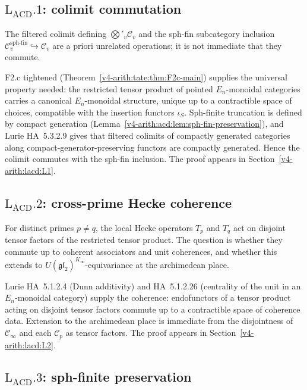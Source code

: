 \subsection{\(\mathrm{L}_{\mathrm{ACD}}.1\): colimit commutation}

The filtered colimit defining \(\bigotimes'_{v}\mathcal{C}_{v}\) and
the sph-fin subcategory inclusion
\(\mathcal{C}_{v}^{\mathrm{sph\text{-}fin}} \hookrightarrow \mathcal{C}_{v}\)
are a priori unrelated operations; it is not immediate that they commute.

F2.c tightened (Theorem~\ref{v4-arith:tate:thm:F2c-main}) supplies the
universal property needed: the restricted tensor product of pointed
\(E_{n}\)-monoidal categories carries a canonical \(E_{n}\)-monoidal
structure, unique up to a contractible space of choices, compatible with
the insertion functors \(\iota_{S}\). Sph-finite truncation is defined by
compact generation (Lemma~\ref{v4-arith:acd:lem:sph-fin-preservation}), and
Lurie HA~5.3.2.9 gives that filtered colimits of compactly generated
categories along compact-generator-preserving functors are compactly
generated. Hence the colimit commutes with the sph-fin inclusion. The
proof appears in Section~\ref{v4-arith:lacd:L1}.

\subsection{\(\mathrm{L}_{\mathrm{ACD}}.2\): cross-prime Hecke coherence}

For distinct primes \(p \neq q\), the local Hecke operators \(T_{p}\)
and \(T_{q}\) act on disjoint tensor factors of the restricted tensor
product. The question is whether they commute up to coherent associators
and unit coherences, and whether this extends to
\(U(\mathfrak{gl}_{2})^{K_{\infty}}\)-equivariance at the archimedean place.

Lurie HA~5.1.2.4 (Dunn additivity) and HA~5.1.2.26 (centrality of the
unit in an \(E_{n}\)-monoidal category) supply the coherence: endofunctors
of a tensor product acting on disjoint tensor factors commute up to a
contractible space of coherence data. Extension to the archimedean place
is immediate from the disjointness of \(\mathcal{C}_{\infty}\) and each
\(\mathcal{C}_{p}\) as tensor factors. The proof appears in
Section~\ref{v4-arith:lacd:L2}.

\subsection{\(\mathrm{L}_{\mathrm{ACD}}.3\): sph-finite preservation}

